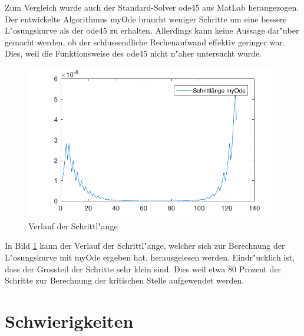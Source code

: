 \begin{refsection}
Zum Vergleich wurde auch der Standard-Solver ode45 aus MatLab herangezogen.
Der entwickelte Algorithmus myOde braucht weniger Schritte um eine bessere L"osungskurve als der ode45 zu erhalten.
Allerdings kann keine Aussage dar"uber gemacht werden, ob der schlussendliche Rechenaufwand effektiv geringer war.
Dies, weil die Funktionsweise des ode45 nicht n"aher untersucht wurde.
\begin{figure}
\centering
\includegraphics{schrittlaenge/images/verlaufSchrittlaenge.pdf}
\caption{Verlauf der Schrittl"ange}
\label{image:verlaufSchrittlaenge}
\end{figure}
In Bild \ref{image:verlaufSchrittlaenge} kann der Verlauf der Schrittl"ange, welcher sich zur Berechnung der L"osungskurve mit myOde ergeben hat, herausgelesen werden.
Eindr"ucklich ist, dass der Grossteil der Schritte sehr klein sind.
Dies weil etwa 80 Prozent der Schritte zur Berechnung der kritischen Stelle aufgewendet werden.

\section{Schwierigkeiten}


\end{refsection}
